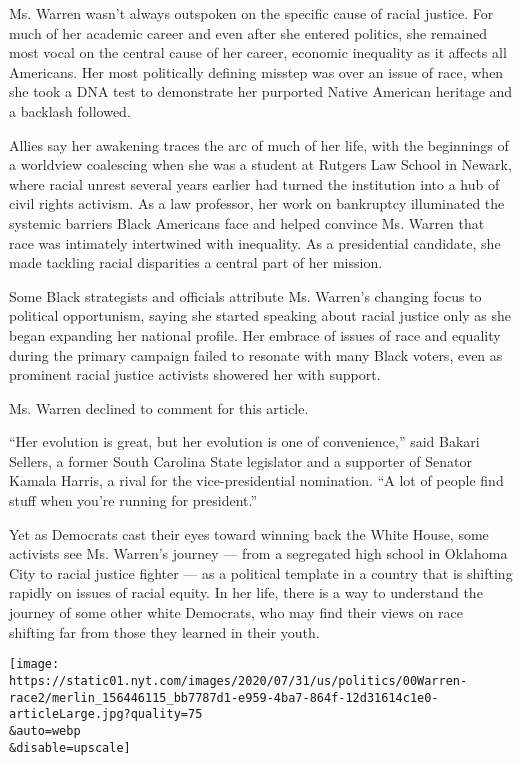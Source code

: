Ms. Warren wasn't always outspoken on the specific cause of racial
justice. For much of her academic career and even after she entered
politics, she remained most vocal on the central cause of her career,
economic inequality as it affects all Americans. Her most politically
defining misstep was over an issue of race, when she took a DNA test to
demonstrate her purported Native American heritage and a backlash
followed.

Allies say her awakening traces the arc of much of her life, with the
beginnings of a worldview coalescing when she was a student at Rutgers
Law School in Newark, where racial unrest several years earlier had
turned the institution into a hub of civil rights activism. As a law
professor, her work on bankruptcy illuminated the systemic barriers
Black Americans face and helped convince Ms. Warren that race was
intimately intertwined with inequality. As a presidential candidate, she
made tackling racial disparities a central part of her mission.

Some Black strategists and officials attribute Ms. Warren's changing
focus to political opportunism, saying she started speaking about racial
justice only as she began expanding her national profile. Her embrace of
issues of race and equality during the primary campaign failed to
resonate with many Black voters, even as prominent racial justice
activists showered her with support.

Ms. Warren declined to comment for this article.

``Her evolution is great, but her evolution is one of convenience,''
said Bakari Sellers, a former South Carolina State legislator and a
supporter of Senator Kamala Harris, a rival for the vice-presidential
nomination. ``A lot of people find stuff when you're running for
president.''

Yet as Democrats cast their eyes toward winning back the White House,
some activists see Ms. Warren's journey --- from a segregated high
school in Oklahoma City to racial justice fighter --- as a political
template in a country that is shifting rapidly on issues of racial
equity. In her life, there is a way to understand the journey of some
other white Democrats, who may find their views on race shifting far
from those they learned in their youth.

\texttt{[image: https://static01.nyt.com/images/2020/07/31/us/politics/00Warren-race2/merlin\_156446115\_bb7787d1-e959-4ba7-864f-12d31614c1e0-articleLarge.jpg?quality=75\\\&auto=webp\\\&disable=upscale]}

